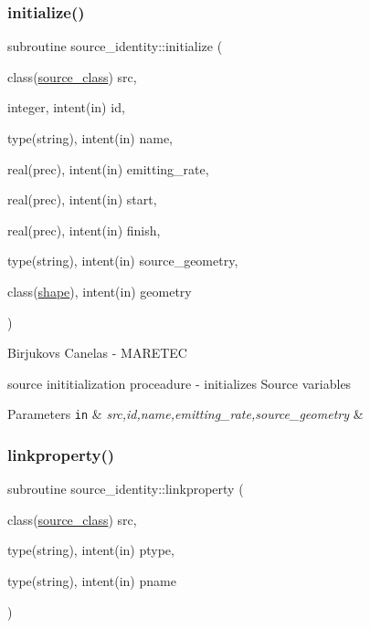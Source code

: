 \subsubsection{\texorpdfstring{initialize()}{initialize()}}
{\footnotesize\ttfamily subroutine source\+\_\+identity\+::initialize (\begin{DoxyParamCaption}\item[{class(\hyperlink{structsource__identity_1_1source__class}{source\+\_\+class})}]{src,  }\item[{integer, intent(in)}]{id,  }\item[{type(string), intent(in)}]{name,  }\item[{real(prec), intent(in)}]{emitting\+\_\+rate,  }\item[{real(prec), intent(in)}]{start,  }\item[{real(prec), intent(in)}]{finish,  }\item[{type(string), intent(in)}]{source\+\_\+geometry,  }\item[{class(\hyperlink{structgeometry_1_1shape}{shape}), intent(in)}]{geometry }\end{DoxyParamCaption})\hspace{0.3cm}{\ttfamily [private]}}



Birjukovs Canelas -\/ M\+A\+R\+E\+T\+EC 

source inititialization proceadure -\/ initializes Source variables 
\begin{DoxyParams}[1]{Parameters}
\mbox{\tt in}  & {\em src,id,name,emitting\+\_\+rate,source\+\_\+geometry} & \\
\hline
\end{DoxyParams}
\mbox{\label{namespacesource__identity_a43fd5b86e85ddeadf982708445286e26}} 
\subsubsection{\texorpdfstring{linkproperty()}{linkproperty()}}
{\footnotesize\ttfamily subroutine source\+\_\+identity\+::linkproperty (\begin{DoxyParamCaption}\item[{class(\hyperlink{structsource__identity_1_1source__class}{source\+\_\+class})}]{src,  }\item[{type(string), intent(in)}]{ptype,  }\item[{type(string), intent(in)}]{pname }\end{DoxyParamCaption})\hspace{0.3cm}{\ttfamily [private]}}



